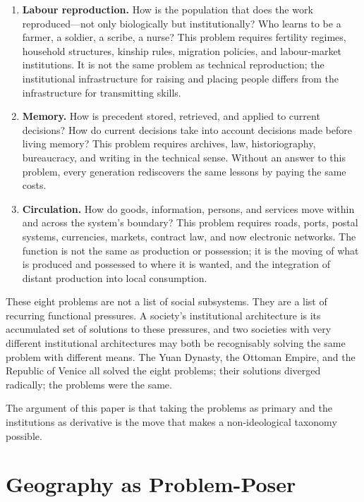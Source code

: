 \documentclass[12pt,a4paper]{article}
\begin{document}
\begin{enumerate}[leftmargin=1.8em, label=\textbf{\arabic*.}]
\item \textbf{Labour reproduction.} How is the population that does the work reproduced---not only biologically but institutionally? Who learns to be a farmer, a soldier, a scribe, a nurse? This problem requires fertility regimes, household structures, kinship rules, migration policies, and labour-market institutions. It is not the same problem as technical reproduction; the institutional infrastructure for raising and placing people differs from the infrastructure for transmitting skills.

\item \textbf{Memory.} How is precedent stored, retrieved, and applied to current decisions? How do current decisions take into account decisions made before living memory? This problem requires archives, law, historiography, bureaucracy, and writing in the technical sense. Without an answer to this problem, every generation rediscovers the same lessons by paying the same costs.

\item \textbf{Circulation.} How do goods, information, persons, and services move within and across the system's boundary? This problem requires roads, ports, postal systems, currencies, markets, contract law, and now electronic networks. The function is not the same as production or possession; it is the moving of what is produced and possessed to where it is wanted, and the integration of distant production into local consumption.

\end{enumerate}

These eight problems are not a list of social subsystems. They are a list of recurring functional pressures. A society's institutional architecture is its accumulated set of solutions to these pressures, and two societies with very different institutional architectures may both be recognisably solving the same problem with different means. The Yuan Dynasty, the Ottoman Empire, and the Republic of Venice all solved the eight problems; their solutions diverged radically; the problems were the same.

The argument of this paper is that taking the problems as primary and the institutions as derivative is the move that makes a non-ideological taxonomy possible.

\section{Geography as Problem-Poser}
\end{document}
